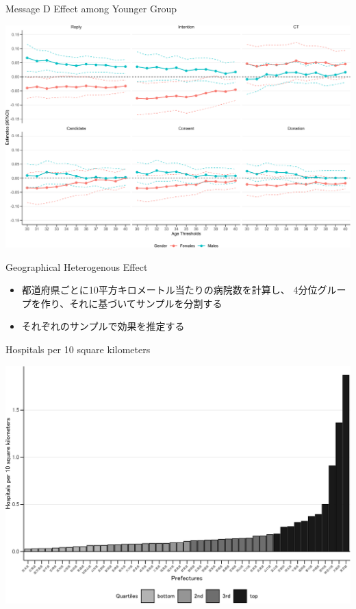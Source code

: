 \documentclass[
      aspectratio=169,
        12pt,
    ]{beamer}
\providecommand{\tightlist}{%
  \setlength{\itemsep}{0pt}\setlength{\parskip}{0pt}}
\begin{document}
\begin{frame}{Message D Effect among Younger Group}
\protect\hypertarget{message-d-effect-among-younger-group}{}
\begin{center}\includegraphics[width=0.75\linewidth]{report_files/figure-beamer/plotD-change-age-threshold-1} \end{center}
\end{frame}

\begin{frame}{Geographical Heterogenous Effect}
\protect\hypertarget{geographical-heterogenous-effect}{}
\begin{itemize}
\tightlist
\item
  都道府県ごとに10平方キロメートル当たりの病院数を計算し、
  4分位グループを作り、それに基づいてサンプルを分割する
\item
  それぞれのサンプルで効果を推定する
\end{itemize}
\end{frame}

\begin{frame}{Hospitals per 10 square kilometers}
\protect\hypertarget{hospitals-per-10-square-kilometers}{}
\begin{center}\includegraphics[width=0.75\linewidth]{report_files/figure-beamer/plot-hospital-per-area-1} \end{center}
\end{frame}
\end{document}
